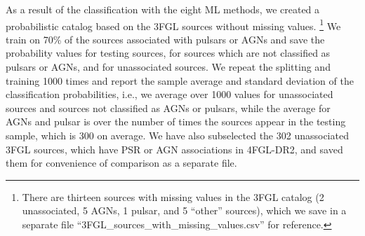 As a result of the classification with the eight ML methods,
we created a probabilistic catalog based on the 3FGL sources without missing values.%
\footnote{There are thirteen sources with missing values in the 3FGL catalog (2 unassociated, 5 AGNs, 1 pulsar, and 5 ``other'' sources), 
which we save in a separate file ``3FGL\_sources\_with\_missing\_values.csv'' for reference. 
}
We train on 70\% of the sources associated with pulsars or AGNs and save the probability values for testing sources, for sources which are not classified as pulsars or AGNs, and for unassociated sources.
We repeat the splitting and training 1000 times and report the sample average and standard deviation of the classification probabilities,
i.e., we average over 1000 values for unassociated sources and sources not classified as AGNs or pulsars, 
while the average for AGNs and pulsar is over the number of times the sources appear in the testing sample, which is 300 on average.
We have also subselected the 302 unassociated 3FGL sources, which have PSR or AGN associations in 4FGL-DR2,
and saved them for convenience of comparison as a separate file.

